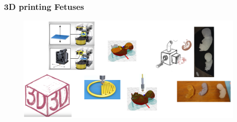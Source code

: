 {
\begin{frame}
  \frametitle{3D printing Fetuses}
  \vspace{10pt}
        \begin{figure}
        \centering
        \includegraphics[width=1.0\textwidth]{./figures/3d-printing/why-and-how/versions/drawing-v02.png}
      \end{figure}

\end{frame}
}






